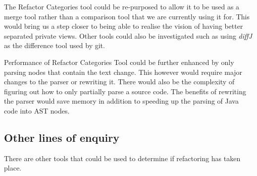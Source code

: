 The Refactor Categories tool could be re-purposed to allow it to be used as a merge tool rather than a comparison tool that we are currently using it for.  This would bring us a step closer to being able to realise the vision of having better separated private views.  Other tools could also be investigated such as using \emph{diffJ} as the difference tool used by git.

Performance of Refactor Categories Tool could be further enhanced by only parsing nodes that contain the text change.  This however would require major changes to the parser or rewriting it. There would also be the complexity of figuring out how to only partially parse a source code. The benefits of rewriting the parser would save memory in addition to speeding up the parsing of Java code into AST nodes.


\subsection{Other lines of enquiry}

There are other tools that could be used to determine if refactoring has taken place.


% 
% 
% 
% 
% 
% 

